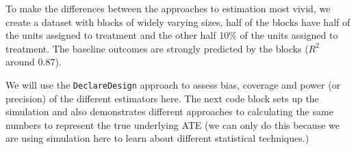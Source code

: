 \documentclass[
  12pt,
]{book}
\newenvironment{Shaded}{\begin{snugshade}}{\end{snugshade}}
\newcommand{\AttributeTok}[1]{\textcolor[rgb]{0.77,0.63,0.00}{#1}}
\newcommand{\DecValTok}[1]{\textcolor[rgb]{0.00,0.00,0.81}{#1}}
\newcommand{\DocumentationTok}[1]{\textcolor[rgb]{0.56,0.35,0.01}{\textbf{\textit{#1}}}}
\newcommand{\FunctionTok}[1]{\textcolor[rgb]{0.00,0.00,0.00}{#1}}
\newcommand{\NormalTok}[1]{#1}
\newcommand{\OtherTok}[1]{\textcolor[rgb]{0.56,0.35,0.01}{#1}}
\newcommand{\SpecialCharTok}[1]{\textcolor[rgb]{0.00,0.00,0.00}{#1}}
\theoremstyle{definition}
\theoremstyle{definition}
\theoremstyle{definition}
\theoremstyle{remark}
\begin{document}
\begin{Shaded}
\end{Shaded}

To make the differences between the approaches to estimation most vivid,
we create a dataset with blocks of widely varying sizes, half of the
blocks have half of the units assigned to treatment and the other half
10\% of the units assigned to treatment. The baseline outcomes are
strongly predicted by the blocks (\(R^2\) around \(0.87\)).

We will use the \texttt{DeclareDesign} approach to assess bias, coverage
and power (or precision) of the different estimators here. The next code
block sets up the simulation and also demonstrates different approaches
to calculating the same numbers to represent the true underlying ATE (we
can only do this because we are using simulation here to learn about
different statistical techniques.)
\end{document}
